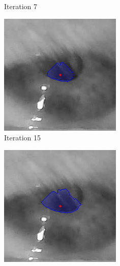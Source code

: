 \begin{figure}[h]
\begin{subfigure}{0.3\textwidth}
        \caption{Iteration 7}
    \end{subfigure}%
    \hfill
    \begin{subfigure}{0.3\textwidth}
        \centering
        \includegraphics[width=0.9\linewidth]{plots/acwe/iteration_15.png}
        \caption{Iteration 15}
    \end{subfigure}%
    \hfill
    \begin{subfigure}{0.3\textwidth}
        \centering
        \includegraphics[width=0.9\linewidth]{plots/acwe/iteration_30.png}

\end{subfigure}
\end{figure}
